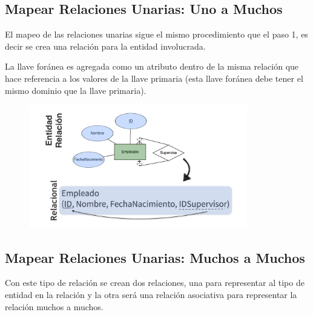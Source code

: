 \documentclass[12pt, fleqn]{report}                             %
\begin{document}
            \clearpage
            \subsection{Mapear Relaciones Unarias: Uno a Muchos}

                El mapeo de las relaciones unarias sigue el mismo procedimiento que el paso 1, es decir
                se crea una relación para la entidad involucrada.

                La llave foránea es agregada como un
                atributo dentro de la misma relación que hace referencia a los valores de la llave
                primaria (esta llave foránea debe tener el mismo dominio que la llave primaria).

                \begin{figure}[h]
                    \centering
                    \includegraphics[width=0.85\textwidth]{MapeoRelacionesUnariasUnoMuchos}
                \end{figure}
                



            \clearpage
            \subsection{Mapear Relaciones Unarias: Muchos a Muchos}

                Con este tipo de relación se crean dos relaciones, una para representar al tipo de entidad en
                la relación y la otra será una relación asociativa para representar la relación muchos a muchos.
\end{document}
